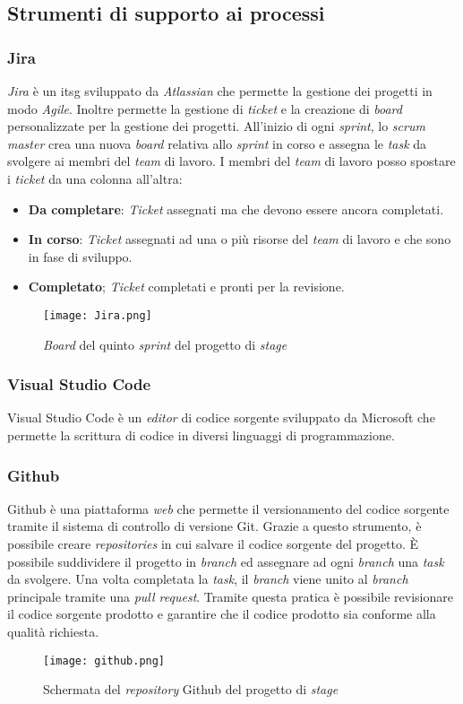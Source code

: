 \subsection{Strumenti di supporto ai processi}
\subsubsection{Jira}
\textit{Jira} è un \gls{itsg} sviluppato da \textit{Atlassian} che permette la gestione dei progetti in modo \textit{Agile}. Inoltre permette la gestione di \textit{ticket} e la creazione di \textit{board} personalizzate per la gestione dei progetti.
All'inizio di ogni \textit{sprint}, lo \textit{scrum master} crea una nuova \textit{board} relativa allo \textit{sprint} in corso e assegna le \textit{task} da svolgere ai membri del \textit{team} di lavoro.
I membri del \textit{team} di lavoro posso spostare i \textit{ticket} da una colonna all'altra: 
\begin{itemize}
    \item \textbf{Da completare}: \textit{Ticket} assegnati ma che devono essere ancora completati.
    \item \textbf{In corso}: \textit{Ticket} assegnati ad una o più risorse del \textit{team} di lavoro e che sono in fase di sviluppo.
    \item \textbf{Completato}; \textit{Ticket} completati e pronti per la revisione.
\end{itemize}
\begin{figure}[H]
    \centering
    \texttt{[image: Jira.png]}
    \caption{\textit{Board} del quinto \textit{sprint} del progetto di \textit{stage}}
    \label{fig:Jira}
\end{figure}
\subsubsection{Visual Studio Code}
Visual Studio Code è un \textit{editor} di codice sorgente sviluppato da Microsoft che permette la scrittura di codice in diversi linguaggi di programmazione.

\subsubsection{Github}
Github è una piattaforma \textit{web} che permette il versionamento del codice sorgente tramite il sistema di controllo di versione Git. 
Grazie a questo strumento, è possibile creare \textit{repositories} in cui salvare il codice sorgente del progetto. 
È possibile suddividere il progetto in \textit{branch} ed assegnare ad ogni \textit{branch} una \textit{task} da svolgere. Una volta completata la \textit{task}, il \textit{branch} viene unito al \textit{branch} principale tramite una \textit{pull request}. 
Tramite questa pratica è possibile revisionare il codice sorgente prodotto e garantire che il codice prodotto sia conforme alla qualità richiesta.
\begin{figure}[H]
    \centering
    \texttt{[image: github.png]}
    \caption{Schermata del \textit{repository} Github del progetto di \textit{stage}}
    \label{fig:Github}
\end{figure}
